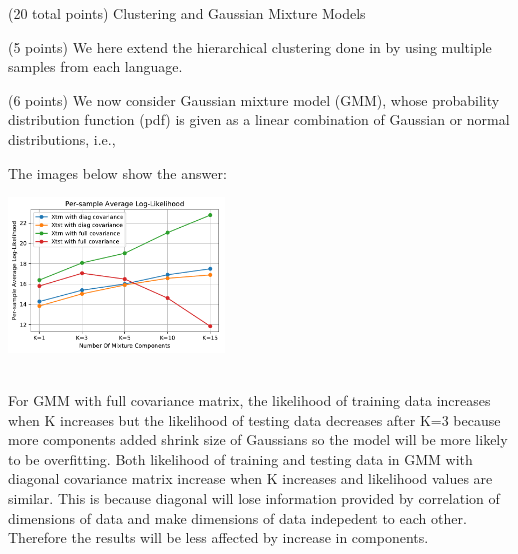 \documentclass[12pt]{article}
\begin{document}
\begin{question}{(20 total points) Clustering and Gaussian Mixture Models}
\begin{subquestion}{(5 points)
       We here extend the hierarchical clustering done in  by
       using multiple samples from each language.
     }
\begin{answerbox}{50em}
      \end{answerbox}
  


   \end{subquestion}
   \begin{subquestion}{(6 points)
       We now consider Gaussian mixture model (GMM), whose
       probability distribution function (pdf) is given as
       a linear combination of Gaussian or normal distributions, i.e.,
     } \label{Q3.5}




      \begin{answerbox}{30em}
         The images below show the answer:
         \begin{center}
         \includegraphics [width=0.43\textwidth]{Mixture.pdf} \end{center}
         \\
         \newline
         For GMM with full covariance matrix, the likelihood of training data increases when K increases but the likelihood of testing data decreases after K=3 because more components added shrink size of Gaussians so the model will be more likely to be overfitting. Both likelihood of training and testing data in GMM with diagonal covariance matrix increase when K increases and likelihood values are similar. This is because diagonal will lose information provided by correlation of dimensions of data and make dimensions of data indepedent to each other. Therefore the results will be less affected by increase in components.
      \end{answerbox}
  



\end{subquestion}
\end{question}
\end{document}
